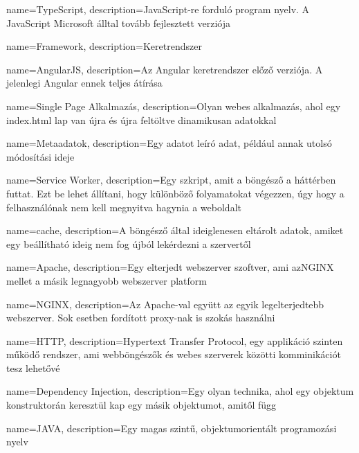 {
        name=TypeScript,
        description={JavaScript-re forduló program nyelv. A JavaScript Microsoft álltal tovább fejlesztett verziója}
}

{
        name=Framework,
        description={Keretrendszer}
}

{
        name=AngularJS,
        description={Az Angular keretrendszer előző verziója. A jelenlegi Angular ennek teljes átírása}
}

{
        name=Single Page Alkalmazás,
        description={Olyan webes alkalmazás, ahol egy index.html lap van újra és újra feltöltve dinamikusan adatokkal}
}

{
        name=Metaadatok,
        description={Egy adatot leíró adat, például annak utolsó módosítási ideje}
}

{
        name=Service Worker,
        description={Egy szkript, amit a böngésző a háttérben futtat. 
        Ezt be lehet állítani, hogy különböző folyamatokat végezzen, úgy hogy a felhasználónak nem kell megnyitva hagynia a weboldalt}
}

{
        name=cache,
        description={A böngésző által ideiglenesen eltárolt adatok, amiket egy beállítható ideig nem fog újból lekérdezni a szervertől}
}

{
        name=Apache,
        description={Egy elterjedt webszerver szoftver, ami az\Gls{NGINX} mellet a másik legnagyobb webszerver platform}
}

{
        name=NGINX,
        description={Az \Gls{Apache}-val együtt az egyik legelterjedtebb webszerver. Sok esetben fordított proxy-nak is szokás használni}
}

{
        name=HTTP,
        description={Hypertext Transfer Protocol, egy applikáció szinten működő rendszer, ami webböngészők és webes szerverek közötti komminikációt tesz lehetővé}
}

{
        name=Dependency Injection,
        description={Egy olyan technika, ahol egy objektum konstruktorán keresztül kap egy másik objektumot, amitől függ}
}

{
        name=JAVA,
        description={Egy magas szintű, objektumorientált programozási nyelv}
}
 
